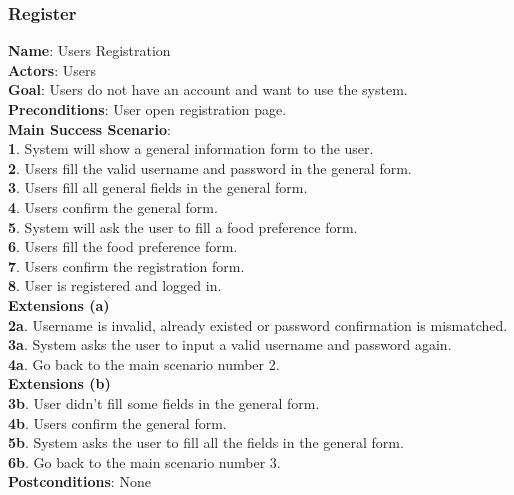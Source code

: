 \documentclass[12pt,oneside,openright,a4paper]{cpe-english-project}
\begin{document}
\subsubsection{Register}
\textbf{Name}: Users Registration\\
\textbf{Actors}: Users\\
\textbf{Goal}: Users do not have an account and want to use the system.\\
\textbf{Preconditions}: User open registration page.\\
\textbf{Main Success Scenario}: \\
\textbf{1}. System will show a general information form to the user.\\
\textbf{2}. Users fill the valid username and password in the general form.\\
\textbf{3}. Users fill all general fields in the general form.\\
\textbf{4}. Users confirm the general form.\\
\textbf{5}. System will ask the user to fill a food preference form.\\
\textbf{6}. Users fill the food preference form.\\
\textbf{7}. Users confirm the registration form.\\
\textbf{8}. User is registered and logged in.\\
\textbf{Extensions (a)} \\
\textbf{2a}. Username is invalid, already existed or password confirmation is mismatched.\\
\textbf{3a}. System asks the user to input a valid username and password again.\\
\textbf{4a}. Go back to the main scenario number 2.\\
\textbf{Extensions (b)} \\
\textbf{3b}. User didn’t fill some fields in the general form.\\
\textbf{4b}. Users confirm the general form.\\
\textbf{5b}. System asks the user to fill all the fields in the general form.\\
\textbf{6b}. Go back to the main scenario number 3.\\
\textbf{Postconditions}: None
\end{document}
